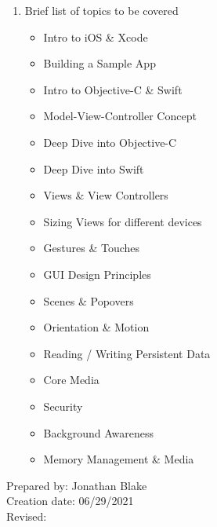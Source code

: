 \begin{enumerate}[1.]
\item Brief list of topics to be covered\\
  {\bfseries
    \begin{itemize}
      \item Intro to iOS \& Xcode
      \item Building a Sample App
      \item Intro to Objective-C \& Swift
      \item Model-View-Controller Concept
      \item Deep Dive into Objective-C
      \item Deep Dive into Swift
      \item Views \& View Controllers
      \item Sizing Views for different devices
      \item Gestures \& Touches
      \item GUI Design Principles
      \item Scenes \& Popovers
      \item Orientation \& Motion
      \item Reading / Writing Persistent Data
      \item Core Media
      \item Security
      \item Background Awareness
      \item Memory Management \& Media
    \end{itemize}
  }

\end{enumerate}

\noindent Prepared by: Jonathan Blake\\
\noindent Creation date: 06/29/2021\\
\noindent Revised:\\
